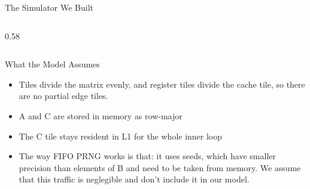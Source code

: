 \documentclass[aspectratio=169]{beamer}
\begin{document}
\begin{frame}{The Simulator We Built}
\begin{columns}[c]
\begin{column}{0.58\textwidth}
    \end{column}

  \end{columns}

\end{frame}


\begin{frame}{What the Model Assumes}

  \begin{itemize}
    \item Tiles divide the matrix evenly, and register tiles divide the cache
      tile, so there are no partial edge tiles.
    \item A and C are stored in memory as row-major
    \item The C tile stays resident in L1 for the whole inner loop
    \item The way FIFO PRNG works is that: it uses seeds, which have smaller
      precision than elements of B and need to be taken from memory. We assume
      that this traffic is neglegible and don't include it in our model.
  \end{itemize}

\end{frame}
\end{document}
